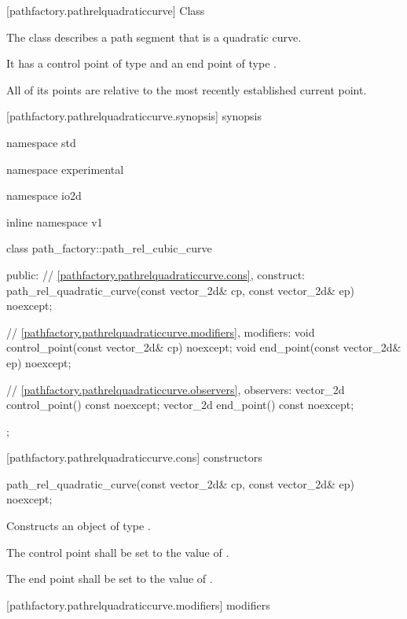  [pathfactory.pathrelquadraticcurve] {Class }

\pnum
{}
The class  describes a path segment that is a quadratic \bezierlocal curve.

\pnum
It has a control point of type  and an end point of type .

\pnum
All of its points are relative to the most recently established current point.

 [pathfactory.pathrelquadraticcurve.synopsis] { synopsis}

\begin{codeblock}
namespace std { namespace experimental { namespace io2d { inline namespace v1 {
  class path_factory::path_rel_cubic_curve {
  public:
    // \ref{pathfactory.pathrelquadraticcurve.cons}, construct:
    path_rel_quadratic_curve(const vector_2d& cp, const vector_2d& ep) noexcept;

    // \ref{pathfactory.pathrelquadraticcurve.modifiers}, modifiers:
    void control_point(const vector_2d& cp) noexcept;
    void end_point(const vector_2d& ep) noexcept;


    // \ref{pathfactory.pathrelquadraticcurve.observers}, observers:
    vector_2d control_point() const noexcept;
    vector_2d end_point() const noexcept;
  };
} } } }
\end{codeblock}

 [pathfactory.pathrelquadraticcurve.cons] { constructors}

\begin{itemdecl}
    path_rel_quadratic_curve(const vector_2d& cp, const vector_2d& ep) noexcept;
\end{itemdecl}
\begin{itemdescr}
	\pnum
	\effects
	Constructs an object of type .
	
	\pnum
	The control point shall be set to the value of .
	
	\pnum
	The end point shall be set to the value of .
\end{itemdescr}

 [pathfactory.pathrelquadraticcurve.modifiers]{ modifiers}

